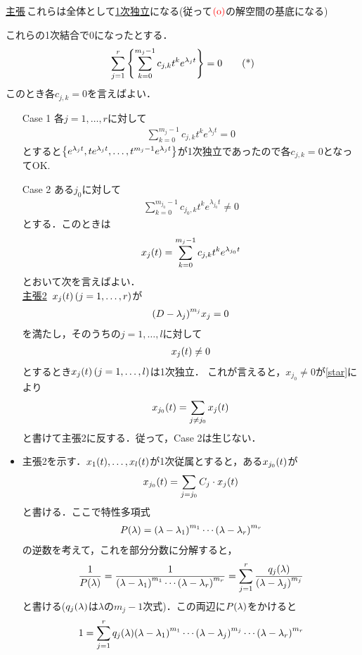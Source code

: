 \documentclass[autodetect-engine,dvipdfmx-if-dvi,ja=standard]{bxjsarticle}
\makeatletter
\theoremstyle{mystyle1}
\theoremstyle{mystyle2}
\renewenvironment{proof}[1][\proofname]{\par
  \pushQED{\qed}%
  \normalfont
  \topsep6\p@\@plus6\p@ \trivlist
  \item[\hskip\labelsep{\bfseries\sffamily #1}]\ignorespaces
}{%
  \popQED\endtrivlist\@endpefalse
}
\renewcommand\proofname{\ensuremath{\because}}
\newcommand{\redo}{\ensuremath{\color{red}\qty(\textrm{o})\color{black}}}
\makeatother
\begin{document}
\underline{主張}\,これらは全体として\underline{1次独立}になる(従って\redo の解空間の基底になる)
\begin{proof}
  これらの1次結合で0になったとする．\begin{equation}
    \sum_{j=1}^r\qty{\sum_{k=0}^{m_j-1}c_{j,k}t^ke^{\lambda_jt}}=0\label{star}\tag{*}
  \end{equation}
  このとき各$c_{j,k}=0$を言えばよい．
  \begin{itemize}
    \item[Case 1] 各$j=1,\ldots,r$に対して\begin{align*}\sum_{k=0}^{m_j-1}c_{j,k}t^ke^{\lambda_jt}=0\end{align*}とすると$\qty{e^{\lambda_jt},te^{\lambda_jt},\ldots,t^{m_j-1}e^{\lambda_jt}}$が1次独立であったので各$c_{j,k}=0$となってOK.
    \item[Case 2] ある$j_0$に対して\begin{align*}\sum_{k=0}^{m_{j_0}-1}c_{j_0,k}t^ke^{\lambda_{j_0}t}\neq 0\end{align*}とする．このときは\begin{align*}x_j\qty(t)=\sum_{k=0}^{m_j-1}c_{j,k}t^ke^{\lambda_{j_0}t}\end{align*}とおいて次を言えばよい．\\
          \underline{主張2}\ $x_j\qty(t)\,\qty(j=1,\ldots,r)$が\begin{align*}\qty(D-\lambda_j)^{m_j}x_j=0\end{align*}を満たし，そのうちの$j=1,\ldots,l$に対して\begin{align*}x_j\qty(t)\neq 0\end{align*}とするとき$x_j\qty(t)\,\qty(j=1,\ldots,l)$は1次独立．
          これが言えると，$x_{j_0}\neq 0$が\ref{star}により\begin{align*}x_{j_0}\qty(t)=\sum_{j\neq j_0}x_j\qty(t)\end{align*}と書けて主張2に反する．従って，Case 2は生じない．
          \begin{proof}
            主張2を示す．$x_1\qty(t),\ldots,x_l\qty(t)$が1次従属とすると，ある$x_{j_0}\qty(t)$が\begin{align*}x_{j_0}\qty(t)=\sum_{j=j_0}C_j\cdot x_j\qty(t)\end{align*}と書ける．ここで特性多項式\begin{align*}P\qty(\lambda)=\qty(\lambda-\lambda_1)^{m_1}\cdots\qty(\lambda-\lambda_r)^{m_r}\end{align*}の逆数を考えて，これを部分分数に分解すると，\begin{align*}\frac{1}{P\qty(\lambda)}=\frac{1}{\qty(\lambda-\lambda_1)^{m_1}\cdots\qty(\lambda-\lambda_r)^{m_r}}=\sum_{j=1}^r\frac{q_j\qty(\lambda)}{\qty(\lambda-\lambda_j)^{m_j}}\end{align*}と書ける($q_j\qty(\lambda)$は$\lambda$の$m_j-1$次式)．この両辺に$P\qty(\lambda)$をかけると\begin{align*}1=\sum_{j=1}^rq_j\qty(\lambda)\qty(\lambda-\lambda_1)^{m_1}\cdots\qty(\lambda-\lambda_j)^{m_j}\cdots\qty(\lambda-\lambda_r)^{m_r}\end{align*}

\end{proof}
\end{itemize}
\end{proof}
\end{document}
